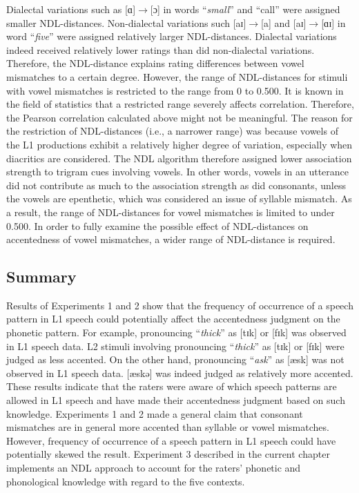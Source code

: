 Dialectal variations such as [ɑ]$\rightarrow$[ɔ] in words “\textit{small}” and “call” were assigned smaller NDL-distances. Non-dialectal variations such [aɪ]$\rightarrow$[a] and [aɪ]$\rightarrow$[ɑɪ] in word “\textit{five}” were assigned relatively larger NDL-distances. Dialectal variations indeed received relatively lower ratings than did non-dialectal variations. Therefore, the NDL-distance explains rating differences between vowel mismatches to a certain degree. However, the range of NDL-distances for stimuli with vowel mismatches is restricted to the range from 0 to 0.500. It is known in the field of statistics that a restricted range severely affects correlation. Therefore, the Pearson correlation calculated above might not be meaningful. The reason for the restriction of NDL-distances (i.e., a narrower range) was because vowels of the L1 productions exhibit a relatively higher degree of variation, especially when diacritics are considered. The NDL algorithm therefore assigned lower association strength to trigram cues involving vowels. In other words, vowels in an utterance did not contribute as much to the association strength as did consonants, unless the vowels are epenthetic, which was considered an issue of syllable mismatch. As a result, the range of NDL-distances for vowel mismatches is limited to under 0.500. In order to fully examine the possible effect of NDL-distances on accentedness of vowel mismatches, a wider range of NDL-distance is required.

\subsection{Summary}

Results of Experiments 1 and 2 show that the frequency of occurrence of a speech pattern in L1 speech could potentially affect the accentedness judgment on the phonetic pattern. For example, pronouncing “\textit{thick}” as [tɪk] or [fɪk] was observed in L1 speech data. L2 stimuli involving pronouncing “\textit{thick}” as [tɪk] or [fɪk] were judged as less accented. On the other hand, pronouncing “\textit{ask}” as [æsk] was not observed in L1 speech data. [æskə] was indeed judged as relatively more accented. These results indicate that the raters were aware of which speech patterns are allowed in L1 speech and have made their accentedness judgment based on such knowledge.  Experiments 1 and 2 made a general claim that consonant mismatches are in general more accented than syllable or vowel mismatches. However, frequency of occurrence of a speech pattern in L1 speech could have potentially skewed the result. Experiment 3 described in the current chapter implements an NDL approach to account for the raters’ phonetic and phonological knowledge with regard to the five contexts. 

